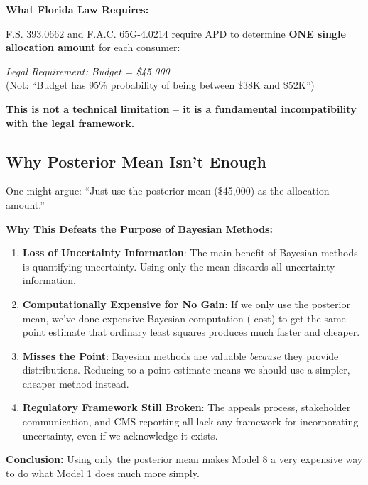 \textbf{What Florida Law Requires:}

F.S. 393.0662 and F.A.C. 65G-4.0214 require APD to determine \textbf{ONE single allocation amount} for each consumer:

\begin{center}
\textit{Legal Requirement: Budget = \$45,000} \\
(Not: ``Budget has 95\% probability of being between \$38K and \$52K'')
\end{center}

\textbf{This is not a technical limitation -- it is a fundamental incompatibility with the legal framework.}

\subsection{Why Posterior Mean Isn't Enough}

One might argue: ``Just use the posterior mean (\$45,000) as the allocation amount.''

\textbf{Why This Defeats the Purpose of Bayesian Methods:}

\begin{enumerate}
    \item \textbf{Loss of Uncertainty Information}: The main benefit of Bayesian methods is quantifying uncertainty. Using only the mean discards all uncertainty information.
    
    \item \textbf{Computationally Expensive for No Gain}: If we only use the posterior mean, we've done expensive Bayesian computation (\ModelEightThreeYearTCO{} cost) to get the same point estimate that ordinary least squares produces much faster and cheaper.
    
    \item \textbf{Misses the Point}: Bayesian methods are valuable \textit{because} they provide distributions. Reducing to a point estimate means we should use a simpler, cheaper method instead.
    
    \item \textbf{Regulatory Framework Still Broken}: The appeals process, stakeholder communication, and CMS reporting all lack any framework for incorporating uncertainty, even if we acknowledge it exists.
\end{enumerate}

\textbf{Conclusion:} Using only the posterior mean makes Model 8 a very expensive way to do what Model 1 does much more simply.

